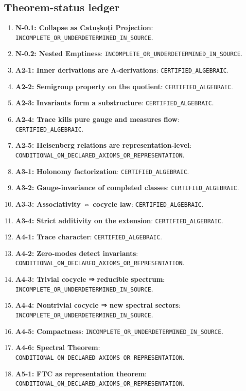 \documentclass[12pt, oneside]{article}
\begin{document}
\subsection{Theorem-status ledger}
\begin{enumerate}
\item \textbf{N-0.1: Collapse as Catuṣkoṭi Projection}: \texttt{INCOMPLETE\_OR\_UNDERDETERMINED\_IN\_SOURCE}.
\item \textbf{N-0.2: Nested Emptiness}: \texttt{INCOMPLETE\_OR\_UNDERDETERMINED\_IN\_SOURCE}.
\item \textbf{A2-1: Inner derivations are Λ-derivations}: \texttt{CERTIFIED\_ALGEBRAIC}.
\item \textbf{A2-2: Semigroup property on the quotient}: \texttt{CERTIFIED\_ALGEBRAIC}.
\item \textbf{A2-3: Invariants form a substructure}: \texttt{CERTIFIED\_ALGEBRAIC}.
\item \textbf{A2-4: Trace kills pure gauge and measures flow}: \texttt{CERTIFIED\_ALGEBRAIC}.
\item \textbf{A2-5: Heisenberg relations are representation-level}: \texttt{CONDITIONAL\_ON\_DECLARED\_AXIOMS\_OR\_REPRESENTATION}.
\item \textbf{A3-1: Holonomy factorization}: \texttt{CERTIFIED\_ALGEBRAIC}.
\item \textbf{A3-2: Gauge-invariance of completed classes}: \texttt{CERTIFIED\_ALGEBRAIC}.
\item \textbf{A3-3: Associativity ⇔ cocycle law}: \texttt{CERTIFIED\_ALGEBRAIC}.
\item \textbf{A3-4: Strict additivity on the extension}: \texttt{CERTIFIED\_ALGEBRAIC}.
\item \textbf{A4-1: Trace character}: \texttt{CERTIFIED\_ALGEBRAIC}.
\item \textbf{A4-2: Zero-modes detect invariants}: \texttt{CONDITIONAL\_ON\_DECLARED\_AXIOMS\_OR\_REPRESENTATION}.
\item \textbf{A4-3: Trivial cocycle ⇒ reducible spectrum}: \texttt{INCOMPLETE\_OR\_UNDERDETERMINED\_IN\_SOURCE}.
\item \textbf{A4-4: Nontrivial cocycle ⇒ new spectral sectors}: \texttt{INCOMPLETE\_OR\_UNDERDETERMINED\_IN\_SOURCE}.
\item \textbf{A4-5: Compactness}: \texttt{INCOMPLETE\_OR\_UNDERDETERMINED\_IN\_SOURCE}.
\item \textbf{A4-6: Spectral Theorem}: \texttt{CONDITIONAL\_ON\_DECLARED\_AXIOMS\_OR\_REPRESENTATION}.
\item \textbf{A5-1: FTC as representation theorem}: \texttt{CONDITIONAL\_ON\_DECLARED\_AXIOMS\_OR\_REPRESENTATION}.

\end{enumerate}
\end{document}
